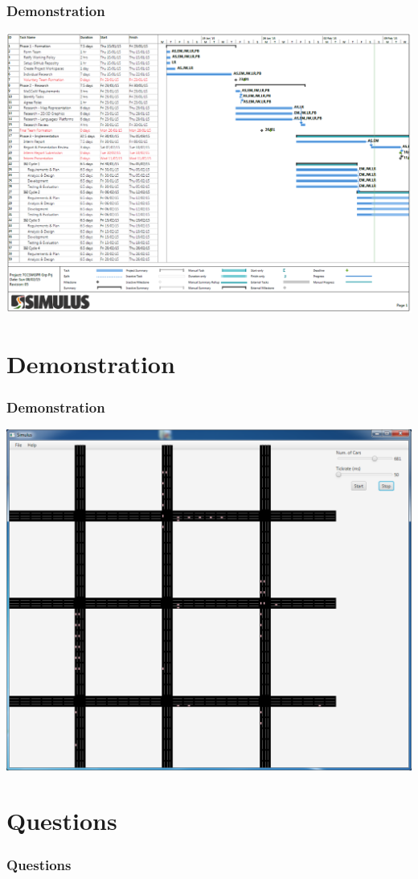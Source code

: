 \documentclass{beamer}
\begin{document}
\begin{frame}
\frametitle{Demonstration}
\includegraphics[scale=0.3]{gantt}
\end{frame}

\section{Demonstration}

\begin{frame}
\frametitle{Demonstration}
\includegraphics[scale=0.25]{screenshot}
\end{frame}

\section{Questions}

\begin{frame}
\frametitle{Questions}

\end{frame}
\end{document}
